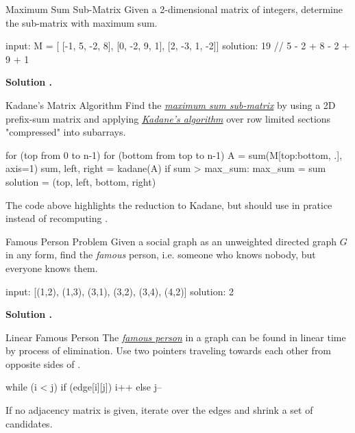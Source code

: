 \documentclass{cognito}
\begin{document}
\begin{note}{Maximum Sum Sub-Matrix}
	Given a 2-dimensional matrix  of integers,
	determine the sub-matrix with maximum sum.
	\begin{largecode}
 input: M = [ [-1, 5, -2, 8],
 		 	  [0, -2, 9, 1],
		 	  [2, -3, 1, -2]]
 solution: 19 //  5 - 2 + 8 - 2 + 9 + 1
	\end{largecode}
	\bf Solution \hyperref[note:Kadane's Matrix Algorithm]{\solutionref}.
\end{note}

\begin{note}{Kadane's Matrix Algorithm}
	Find the \hyperref[note:Maximum Sum Sub-Matrix]{\it maximum sum sub-matrix}
	by using a 2D prefix-sum matrix  and applying
	\hyperref[note:Kadane's Algorithm]{\it Kadane's algorithm} over row limited
	sections "compressed" into subarrays.
	\begin{largecode}
 for (top from 0 to n-1)
 	for (bottom from top to n-1)
		A = sum(M[top:bottom, .], axis=1)
		sum, left, right = kadane(A)
		if sum > max_sum:
			max_sum = sum
			solution = (top, left, bottom, right) 
	\end{largecode}
	\begin{remark} The code above highlights the reduction to Kadane, but
		should use  in pratice instead of recomputing .
	\end{remark}
	\vspace{-5pt}
\end{note}

\begin{note}{Famous Person Problem}
	Given a social graph as an unweighted directed graph $G$ in any form,
	find the \emph{famous} person, i.e. someone who knows
	nobody, but everyone knows them.
	\begin{largecode}
 input: [(1,2), (1,3), (3,1), (3,2), (3,4), (4,2)]
 solution: 2
	\end{largecode}
	\bf Solution \hyperref[note:Linear Famous Person]{\solutionref}.
\end{note}

\begin{note}{Linear Famous Person}
	The \hyperref[note:Famous Person Problem]{\it famous person} in a graph can be found
	in linear time by process of elimination. Use two pointers  traveling towards each other
	from opposite sides of .
	\begin{largecode}
 while (i < j)
 	if (edge[i][j]) i++ else j--
	\end{largecode}
	\begin{remark} If no adjacency matrix is given, iterate over the edges   and shrink a set  of candidates.\end{remark}
	\vspace{-5pt}
\end{note}
\end{document}
